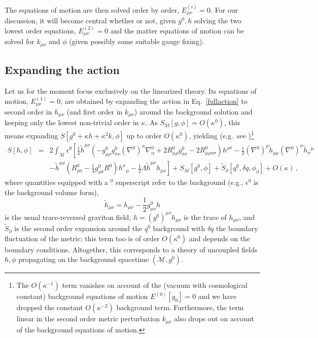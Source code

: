 \documentclass[]{jkpaper}
\theoremstyle{plain}
\theoremstyle{definition}
\begin{document}
The equations of motion are then solved order by order, $E^{(i)}_{\mu \nu}=0$. For our discussion, it will become central whether or not, given $g^0,h$ solving the two lowest order equations, $E^{(2)}_{\mu \nu}=0$ and the matter equations of motion can be solved for $k_{\mu \nu}$ and $\phi$ (given possibly some suitable gauge fixing).



\subsection{Expanding the action}

Let us for the moment focus exclusively on the linearized theory. 
Its equations of motion, $E^{(1)}_{\mu \nu}=0$, are obtained by expanding the action in Eq.~\eqref{fullaction} to second order in $h_{\mu \nu}$ (and first order in $k_{\mu \nu}$) around the background solution and keeping only the lowest non-trivial order in $\kappa$. As $S_M[g,\phi]=O(\kappa^0)$, this means expanding $S[g^0+\kappa h+\kappa^2 k,\phi]$ up to order $O(\kappa^0)$, yielding (e.g.\ see \cite{Christensen:1979iy})\footnote{The $O(\kappa^{-1})$ term vanishes on account of the (vacuum with cosmological constant) background equations of motion $E^{(0)}[g_0]=0$ and we have dropped the constant $O(\kappa^{-2})$ background term. Furthermore, the term linear in the second order metric perturbation $k_{\mu \nu}$ also drops out on account of the background equations of motion.}
\begin{eqnarray}
    S[h,\phi]&=&2\int_\mathcal{M}\epsilon^0\left[\frac{1}{4}\tilde h^{\mu \nu}\left(-g^0_{\mu \rho}g^0_{\sigma \nu}(\nabla^0)^\alpha\nabla_\alpha^0+2R^0_{\mu \rho}g^0_{\sigma \nu}-2R^0_{\mu \rho \nu \sigma}\right)h^{\rho \sigma}-\frac{1}{2}(\nabla^0)^\rho\tilde h_{\rho \mu}(\nabla^0)^\sigma\tilde h_\sigma{}^\mu\right.\nonumber\\
    &&\left. -\tilde h^{\mu \rho}\left(R^0_{\rho \sigma}-\frac{1}{4}g^0_{\rho \sigma}R^0\right)h^\sigma{}_\mu-\frac{1}{2}\Lambda\tilde h^{\mu \nu}h_{\mu \nu}\right]+S_M[g^0,\phi]+\tilde S_\partial[q^0,\delta q,\phi_\partial]+O(\kappa)\,,\label{expaction}
\end{eqnarray}
where quantities equipped with a ${}^0$ superscript refer to the background (e.g., $\epsilon^0$ is the background volume form),
\begin{equation}
    \tilde h_{\mu \nu}=h_{\mu \nu}-\frac{1}{2}g^0_{\mu \nu}h
\end{equation}
is the usual trace-reversed graviton field, $h=(g^0)^{\mu \nu}h_{\mu \nu}$ is the trace of $h_{\mu \nu}$, and $\tilde S_\partial$ is the second order expansion around the $q^0$ background with $\delta q$ the boundary fluctuation of the metric; this term too is of order $O(\kappa^0)$ and depends on the boundary conditions. Altogether, this corresponds to a theory of uncoupled fields $h,\phi$ propagating on the background spacetime $(\mathcal M,g^0)$.
\end{document}
